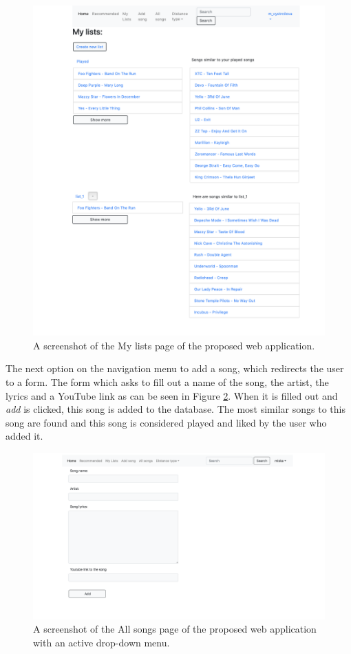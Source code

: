 \begin{figure}[H]
    \centering
	\includegraphics[width=1\linewidth]{./img/my_lists_page.png}
	\caption{A screenshot of the My lists page of the proposed web application.}
	\label{fig:my_lists_page}
\end{figure}
The next option on the navigation menu to add a song, which redirects the user to a form. The form which asks to fill out a name of the song, the artist, the lyrics and a YouTube link as can be seen in Figure \ref{fig:add_song_form}. When it is filled out and \textit{add} is clicked, this song is added to the database. The most similar songs to this song are found and this song is considered played and liked by the user who added it.\\
\begin{figure}[H]
    \centering
	\includegraphics[width=1\linewidth]{./img/add_song_form.png}
	\caption{A screenshot of the All songs page of the proposed web application with an active drop-down menu.}
	\label{fig:add_song_form}
\end{figure}
